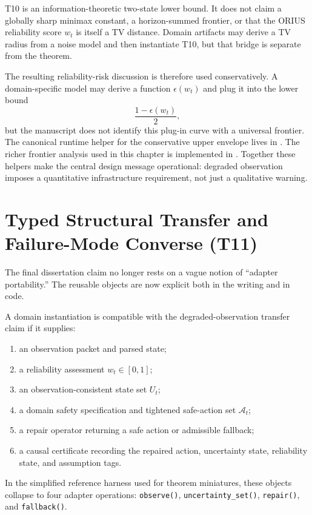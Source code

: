 \begin{remark}
T10 is an information-theoretic two-state lower bound. It does not claim a
globally sharp minimax constant, a horizon-summed frontier, or that the ORIUS
reliability score \(w_t\) is itself a TV distance. Domain artifacts may derive
a TV radius from a noise model and then instantiate T10, but that bridge is
separate from the theorem.
\end{remark}

The resulting reliability-risk discussion is therefore used conservatively. A
domain-specific model may derive a function \(\epsilon(w_t)\) and plug it into
the lower bound
\[
  \frac{1-\epsilon(w_t)}{2},
\]
but the manuscript does not identify this plug-in curve with a universal
frontier. The canonical runtime helper for the conservative upper envelope lives in
.  The richer frontier analysis
used in this chapter is implemented in
.  Together these
helpers make the central design message operational: degraded observation
imposes a quantitative infrastructure requirement, not just a qualitative
warning.

\section{Typed Structural Transfer and Failure-Mode Converse (T11)}
\label{subsec:adapter-contract}

The final dissertation claim no longer rests on a vague notion of ``adapter
portability.''  The reusable objects are now explicit both in the writing and
in code.

\begin{definition}
\label{def:adapter-contract}
A domain instantiation is compatible with the degraded-observation transfer
claim if it supplies:
\begin{enumerate}
  \item an observation packet and parsed state;
  \item a reliability assessment $w_t \in [0,1]$;
  \item an observation-consistent state set $U_t$;
  \item a domain safety specification and tightened safe-action set
    $\mathcal{A}_t$;
  \item a repair operator returning a safe action or admissible fallback;
  \item a causal certificate recording the repaired action, uncertainty state,
    reliability state, and assumption tags.
\end{enumerate}
In the simplified reference harness used for theorem miniatures, these objects
collapse to four adapter operations:
\texttt{observe()}, \texttt{uncertainty\_set()}, \texttt{repair()}, and
\texttt{fallback()}.
\end{definition}

